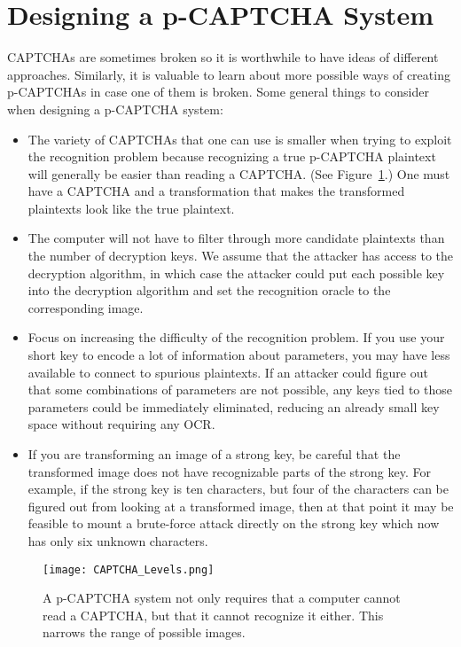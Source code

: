 \documentclass[12pt]{article}
\begin{document}
\section*{Designing a p-CAPTCHA System}

CAPTCHAs are sometimes broken so it is worthwhile to have ideas of different approaches. Similarly, it is valuable to learn about more possible ways of creating p-CAPTCHAs in case one of them is broken. Some general things to consider when designing a p-CAPTCHA system:
\begin{itemize}
\item The variety of CAPTCHAs that one can use is smaller when trying to exploit the recognition problem because recognizing a true p-CAPTCHA plaintext will generally be easier than reading a CAPTCHA. (See Figure~{\ref{CAPTCHALevels}}.) One must have a CAPTCHA and a transformation that makes the transformed plaintexts look like the true plaintext.
\item The computer will not have to filter through more candidate plaintexts than the number of decryption keys. We assume that the attacker has access to the decryption algorithm, in which case the attacker could put each possible key into the decryption algorithm and set the recognition oracle to the corresponding image.
\item Focus on increasing the difficulty of the recognition problem. If you use your short key to encode a lot of information about parameters, you may have less available to connect to spurious plaintexts. If an attacker could figure out that some combinations of parameters are not possible, any keys tied to those parameters could be immediately eliminated, reducing an already small key space without requiring any OCR.
\item If you are transforming an image of a strong key, be careful that the transformed image does not have recognizable parts of the strong key. For example, if the strong key is ten characters, but four of the characters can be figured out from looking at a transformed image, then at that point it may be feasible to mount a brute-force attack directly on the strong key which now has only six unknown characters.
\end{itemize}

\begin{figure}
	\begin{center}
		\texttt{[image: CAPTCHA\_Levels.png]}
	\end{center}
	\caption{A p-CAPTCHA system not only requires that a computer cannot read a CAPTCHA, but that it cannot recognize it either. This narrows the range of possible images.}
\label{CAPTCHALevels}
\end{figure}
\end{document}
